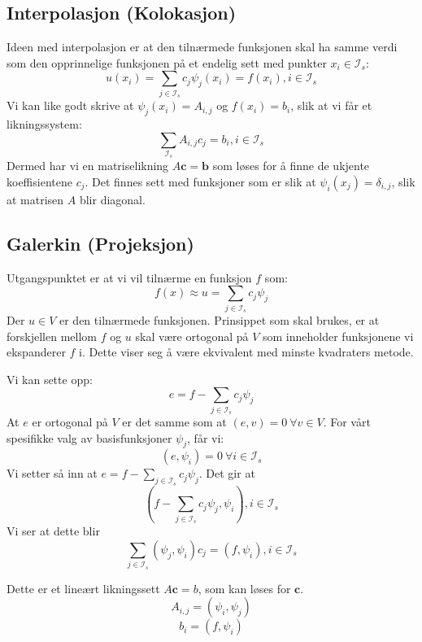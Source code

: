 \documentclass[a4paper, 10pt]{article}
\newcommand{\mb}{\mathbf}
\newcommand{\mc}{\mathcal}
\begin{document}
\subsection{Interpolasjon (Kolokasjon)}
Ideen med interpolasjon er at den tilnærmede funksjonen skal ha samme verdi som den opprinnelige funksjonen på et endelig sett med punkter $x_i \in \mc{I}_s$:
\begin{equation}
	u(x_i) = \sum_{j\in \mc{I}_s}c_j \psi_j(x_i) = f(x_i), i\in \mc{I}_s
\end{equation}
Vi kan like godt skrive at $\psi_j(x_i) = A_{i,j}$ og $f(x_i) = b_i$, slik at vi får et likningssystem:
\begin{equation}
	\sum_{\mc{I}_s} A_{i,j}c_j = b_i, i\in \mc{I}_s
\end{equation}
Dermed har vi en matriselikning $A\mb{c} = \mb{b}$ som løses for å finne de ukjente koeffisientene $c_j$.
Det finnes sett med funksjoner som er slik at $\psi_i(x_j) = \delta_{i,j}$, slik at matrisen $A$ blir diagonal. 

\subsection{Galerkin (Projeksjon)}
Utgangspunktet er at vi vil tilnærme en funksjon $f$ som:
\begin{equation}
	f(x) \approx u = \sum_{j\in \mc{I}_s} c_j \psi_j
\end{equation}
Der $u \in V$ er den tilnærmede funksjonen.
Prinsippet som skal brukes, er at forskjellen mellom $f$ og $u$ skal være ortogonal på $V$ som inneholder funksjonene vi ekspanderer $f$ i. Dette viser seg å være ekvivalent med minste kvadraters metode. 

Vi kan sette opp: 
\begin{equation}
	e = f - \sum_{j\in \mc{I}_s} c_j \psi_j
\end{equation}
At $e$ er ortogonal på $V$ er det samme som at $(e, v) = 0 \  \forall v \in V$. For vårt spesifikke valg av basisfunksjoner $\psi_j$, får vi:
\begin{equation}
	(e, \psi_i) = 0 \ \forall i \in \mc{I}_s
\end{equation}
Vi setter så inn at $e = f - \sum_{j\in \mc{I}_s} c_j \psi_j$. Det gir at
\begin{equation}
	(f - \sum_{j\in \mc{I}_s} c_j \psi_j, \psi_i), i \in \mc{I}_s
\end{equation}
Vi ser at dette blir 
\begin{equation}
	\sum_{j \in \mc{I}_s} (\psi_j, \psi_i)c_j = (f, \psi_i), i\in \mc{I}_s
\end{equation}

Dette er et lineært likningssett $A\mb{c} = b$, som kan løses for $\mb{c}$.
\begin{equation}
	A_{i, j} = (\psi_i, \psi_j)
\end{equation}
\begin{equation}
	b_i = (f, \psi_i)
\end{equation}

\section{}
\end{document}
